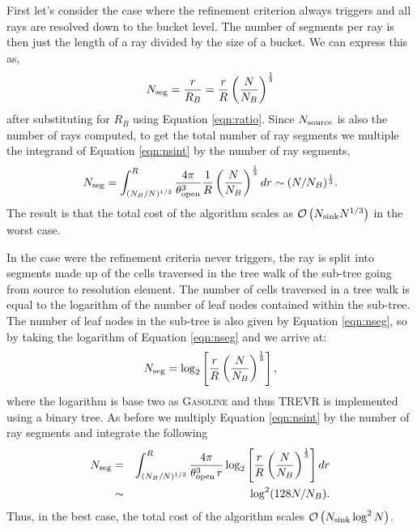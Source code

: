 \documentclass[fleq,usenatbib]{mnras}
\newcommand{\acro}{TREVR}
\newcommand{\bigO}[1]{\mathcal{O}\left(#1\right)}
\newcommand{\NS}{N_{\rm source}}
\newcommand{\NK}{N_{\rm sink}}
\newcommand{\tO}{\theta_{\rm open}}
\begin{document}
{First let's consider the case where the refinement criterion always triggers and 
all rays are resolved down to the bucket level. The number of segments per ray 
is then just the length of a ray divided by the size of a bucket. We can 
express this as,
\begin{equation}
\label{eqn:nseg}
N_{\rm seg} = \frac{r}{R_B} = \frac{r}{R}\left(\frac{N}{N_B}\right)^\frac{1}{3}
\end{equation}
after substituting for $R_B$ using Equation \ref{eqn:ratio}. Since $\NS$ is 
also the number of rays computed, to get the total number of ray segments we
multiple the integrand of 
Equation \ref{eqn:nsint} by the number of ray segments,
\begin{equation}
\label{eqn:nsegint}
N_{\rm seg} = \int_{(N_B/N)^{1/3}}^R 
\frac{4\pi}{\tO^3}
\frac{1}{R}\left(\frac{N}{N_B}\right)^\frac{1}{3} dr
\sim (N/N_B)^\frac{1}{3}.
\end{equation}
The result is that the total cost of the algorithm scales as
$\bigO{\NK N^{1/3}}$ in the worst case.

In the case were the refinement criteria never triggers, the ray is split into 
segments made up of the cells traversed in the tree walk of the sub-tree going 
from source to resolution element. The number of cells traversed in a tree walk
is equal to the logarithm of the number of leaf nodes contained within the 
sub-tree. The number of leaf nodes in the sub-tree is also given by Equation 
\ref{eqn:nseg}, so by taking the logarithm of Equation \ref{eqn:nseg} and we 
arrive at:
\begin{equation}
\label{eqn:nseg2}
N_{\rm seg} = \log_2\left[\frac{r}{R}\left(
\frac{N}{N_B}\right)^\frac{1}{3}\right],
\end{equation}
where the logarithm is base two as \textsc{Gasoline} and thus \acro{} is 
implemented using a binary tree. As before we multiply Equation 
\ref{eqn:nsint} by the number of ray segments and integrate the following
\begin{eqnarray}
\label{eqn:nsegint2}
N_{\rm seg} & = & \int_{(N_B/N)^{1/3}}^R 
\frac{4\pi}{\tO^3\, r}
\log_2\left[\frac{r}{R}\left(
\frac{N}{N_B}\right)^\frac{1}{3}\right] dr \nonumber\\
& \sim & \log^2(128 N/N_B).
\end{eqnarray}
Thus, in the best case, the total cost of the algorithm scales 
$\bigO{\NK \log^2N}$.

}
\end{document}
